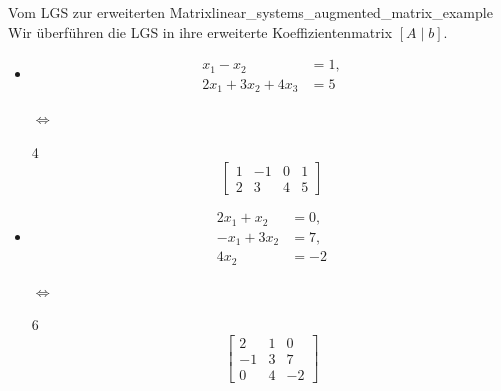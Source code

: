 \begin{ExampleBox}{Vom LGS zur erweiterten Matrix}{linear_systems_augmented_matrix_example}
  Wir überführen die LGS in ihre erweiterte Koeffizientenmatrix $[A\mid b]$.
  \begin{itemize}[leftmargin=1.4em,itemsep=0.8em]
    \item
      \noindent
      \begin{minipage}[c]{0.47\linewidth}
        \[
          \begin{aligned}
             x_1-x_2       &=1,\\
            2x_1+3x_2+4x_3&=5
          \end{aligned}
        \]
      \end{minipage}%
      \begin{minipage}[c]{0.08\linewidth}
        \centering $\Longleftrightarrow$
      \end{minipage}%
      \begin{minipage}[c]{0.42\linewidth}
        \begin{ClozeArea}[12]{4}
          \centering
          \[
            \left[
              \begin{array}{rrr|r}
                1&-1&0&1\\
                2& 3&4&5
              \end{array}
            \right]
          \]
        \end{ClozeArea}
      \end{minipage}

    \item
      \noindent
      \begin{minipage}[c]{0.47\linewidth}
        \[
          \begin{aligned}
             2x_1+x_2&= 0,\\
              -x_1+3x_2&= 7,\\
                   4x_2&=-2
          \end{aligned}
        \]
      \end{minipage}%
      \begin{minipage}[c]{0.08\linewidth}
        \centering $\Longleftrightarrow$
      \end{minipage}%
      \begin{minipage}[c]{0.42\linewidth}
        \begin{ClozeArea}[12]{6}
          \centering
          \[
            \left[
              \begin{array}{rr|r}
                 2&1& 0\\
                -1&3& 7\\
                 0&4&-2
              \end{array}
            \right]
          \]
        \end{ClozeArea}
      \end{minipage}
  \end{itemize}
\end{ExampleBox}
